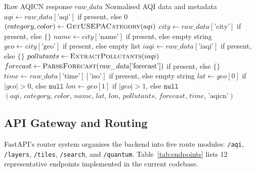 \documentclass[12pt,a4paper]{article}
\begin{document}
\begin{algorithm}[H]
\caption{AQICN Response Normalisation}
\label{alg:aqicn_parse}
\begin{algorithmic}[1]
\Require Raw AQICN response $\mathit{raw\_data}$
\Ensure Normalised AQI data and metadata
\State $aqi \leftarrow \mathit{raw\_data}[\text{'aqi'}]$ if present, else $0$
\State $(category, color) \leftarrow \textsc{GetUSEPACategory}(aqi)$
\State $city \leftarrow \mathit{raw\_data}[\text{'city'}]$ if present, else $\{\}$
\State $name \leftarrow city[\text{'name'}]$ if present, else empty string
\State $geo \leftarrow city[\text{'geo'}]$ if present, else empty list
\State $iaqi \leftarrow \mathit{raw\_data}[\text{'iaqi'}]$ if present, else $\{\}$
\State $pollutants \leftarrow \textsc{ExtractPollutants}(iaqi)$
\State $forecast \leftarrow \textsc{ParseForecast}(\mathit{raw\_data}[\text{'forecast'}])$ if present, else $\{\}$
\State $time \leftarrow \mathit{raw\_data}[\text{'time'}][\text{'iso'}]$ if present, else empty string
\State $lat \leftarrow geo[0]$ if $|geo| > 0$, else $\texttt{null}$
\State $lon \leftarrow geo[1]$ if $|geo| > 1$, else $\texttt{null}$
\State \Return $(aqi,\, category,\, color,\, name,\, lat,\, lon,\, pollutants,\, forecast,\, time,\, \text{'aqicn'})$
\end{algorithmic}
\end{algorithm}

\subsection{API Gateway and Routing}
\label{sec:sysdesign:gateway}

FastAPI's router system organises the backend into five route modules:
\texttt{/aqi}, \texttt{/layers}, \texttt{/tiles}, \texttt{/search}, and
\texttt{/quantum}. Table~\ref{tab:endpoints} lists 12 representative
endpoints implemented in the current codebase.
\end{document}
